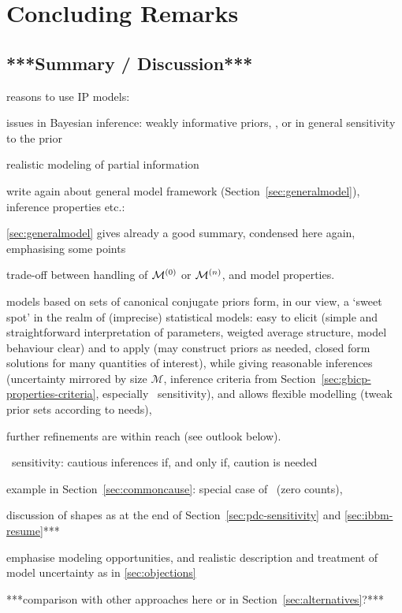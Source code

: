 \chapter{Concluding Remarks}
\label{cha:concluding}


\section{***Summary / Discussion***}

reasons to use IP models:

issues in Bayesian inference: weakly informative priors, \pdc, or in general sensitivity to the prior

realistic modeling of partial information


write again about general model framework (Section~\ref{sec:generalmodel}),
inference properties etc.:

\ref{sec:generalmodel} gives already a good summary, condensed here again, emphasising some points

trade-off between handling of $\mathcal{M}^{(0)}$ or $\mathcal{M}^{(n)}$, and model properties.

models based on sets of canonical conjugate priors form, in our view,
a `sweet spot' in the realm of (imprecise) statistical models:
easy to elicit (simple and straightforward interpretation of parameters,
weigted average structure, model behaviour clear)
and to apply (may construct priors as needed, closed form solutions for many quantities of interest),
while giving reasonable inferences (uncertainty mirrored by size $\mathcal{M}$,
inference criteria from Section~\ref{sec:gbicp-properties-criteria}, especially \pdc\ sensitivity),
and allows flexible modelling (tweak prior sets according to needs),

further refinements are within reach (see outlook below).

\pdc\ sensitivity: cautious inferences if, and only if, caution is needed

example in Section~\ref{sec:commoncause}: special case of \pdc\ (zero counts),


discussion of shapes as at the end of Section~\ref{sec:pdc-sensitivity} and \ref{sec:ibbm-resume}***

emphasise modeling opportunities, and realistic description and treatment
of model uncertainty as in \ref{sec:objections}




***comparison with other approaches here or in Section~\ref{sec:alternatives}?***

